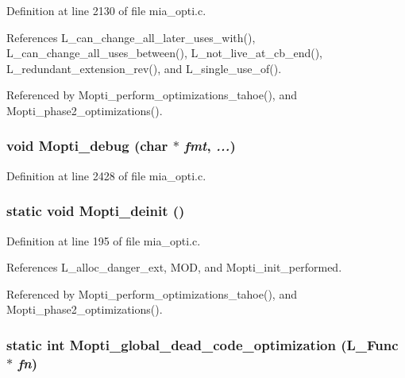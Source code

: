 Definition at line 2130 of file mia\_\-opti.c.

References L\_\-can\_\-change\_\-all\_\-later\_\-uses\_\-with(), L\_\-can\_\-change\_\-all\_\-uses\_\-between(), L\_\-not\_\-live\_\-at\_\-cb\_\-end(), L\_\-redundant\_\-extension\_\-rev(), and L\_\-single\_\-use\_\-of().

Referenced by Mopti\_\-perform\_\-optimizations\_\-tahoe(), and Mopti\_\-phase2\_\-optimizations().
\subsubsection{\setlength{\rightskip}{0pt plus 5cm}void Mopti\_\-debug (char $\ast$ {\em fmt},  {\em ...})}\label{mia__opti_8c_ca52ba4b3401fe69d84481a0a4e0cb94}




Definition at line 2428 of file mia\_\-opti.c.
\subsubsection{\setlength{\rightskip}{0pt plus 5cm}static void Mopti\_\-deinit ()\hspace{0.3cm}{\tt  [static]}}\label{mia__opti_8c_df86bc56421172be873863d24f1c2c81}




Definition at line 195 of file mia\_\-opti.c.

References L\_\-alloc\_\-danger\_\-ext, MOD, and Mopti\_\-init\_\-performed.

Referenced by Mopti\_\-perform\_\-optimizations\_\-tahoe(), and Mopti\_\-phase2\_\-optimizations().
\subsubsection{\setlength{\rightskip}{0pt plus 5cm}static int Mopti\_\-global\_\-dead\_\-code\_\-optimization (L\_\-Func $\ast$ {\em fn})\hspace{0.3cm}{\tt  [static]}}\label{mia__opti_8c_565d7b26894474523f285a8b2769081b}




